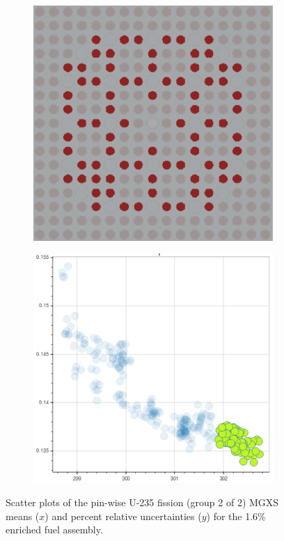 \begin{figure}[h!]
\begin{subfigure}{0.45\textwidth}
  \caption{}
  \label{fig:chap10-fiss-mean-std-mgxs-2}
\end{subfigure}
\begin{subfigure}{0.45\textwidth}
  \centering
  \includegraphics[width=0.9\linewidth]{figures/unsupervised/features/assm-16/u235-fiss/mean-std/geometry-3}
  \caption{}
  \label{fig:chap10-fiss-mean-std-geom-3}
\end{subfigure}%
\begin{subfigure}{0.45\textwidth}
  \centering
  \includegraphics[width=0.9\linewidth]{figures/unsupervised/features/assm-16/u235-fiss/mean-std/mgxs-3}
  \caption{}
  \label{fig:chap10-fiss-mean-std-mgxs-3}
\end{subfigure}
\caption[Clustering of U-235 fission MGXS standard deviations]{Scatter plots of the pin-wise U-235 fission (group 2 of 2) \ac{MGXS} means ($x$) and percent relative uncertainties ($y$) for the 1.6\% enriched fuel assembly.}
\label{fig:chap10-fiss-mean-std}
\end{figure}

